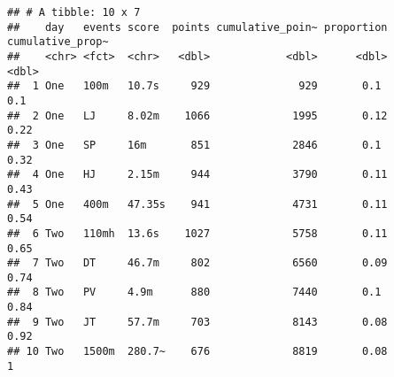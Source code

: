 \documentclass[]{article}
\begin{document}
\begin{verbatim}
## # A tibble: 10 x 7
##    day   events score  points cumulative_poin~ proportion cumulative_prop~
##    <chr> <fct>  <chr>   <dbl>            <dbl>      <dbl>            <dbl>
##  1 One   100m   10.7s     929              929       0.1              0.1 
##  2 One   LJ     8.02m    1066             1995       0.12             0.22
##  3 One   SP     16m       851             2846       0.1              0.32
##  4 One   HJ     2.15m     944             3790       0.11             0.43
##  5 One   400m   47.35s    941             4731       0.11             0.54
##  6 Two   110mh  13.6s    1027             5758       0.11             0.65
##  7 Two   DT     46.7m     802             6560       0.09             0.74
##  8 Two   PV     4.9m      880             7440       0.1              0.84
##  9 Two   JT     57.7m     703             8143       0.08             0.92
## 10 Two   1500m  280.7~    676             8819       0.08             1
\end{verbatim}
\end{document}
